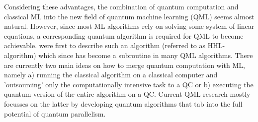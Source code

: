 \documentclass[a4paper]{article}
\newcommand*{\0}{$\ket{0}$}
\newcommand*{\1}{$\ket{1}$}
\begin{document}

Considering these advantages, the combination of quantum computation and classical ML into the new field of quantum machine learning (QML) seems almost natural. However, since most ML algorithms rely on solving some system of linear equations, a corresponding quantum algorithm is required for QML to become achievable. \cite{HHL2009} were first to describe such an algorithm (referred to as HHL-algorithm) which since has become a subroutine in many QML algorithms. There are currently two main ideas on how to merge quantum computation with ML, namely a) running the classical algorithm on a classical computer and 'outsourcing' only the computationally intensive task to a QC or b) executing the quantum version of the entire algorithm on a QC. Current QML research mostly focusses on the latter by developing quantum algorithms that tab into the full potential of quantum parallelism.






\end{document}
